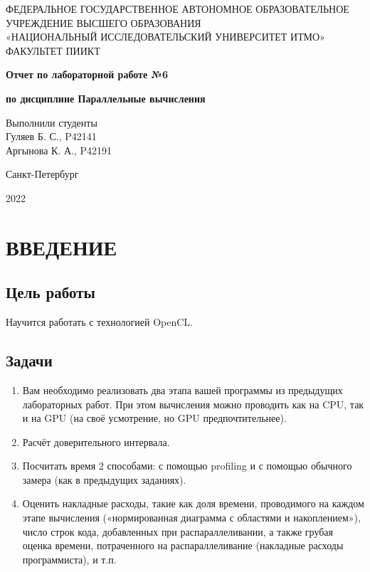 \documentclass[14pt, a4paper, oneside, final]{extarticle}
\begin{document}
 
\setcounter{page}{0}
\begin{center} 
\small
\footnotesize{ФЕДЕРАЛЬНОЕ ГОСУДАРСТВЕННОЕ АВТОНОМНОЕ ОБРАЗОВАТЕЛЬНОЕ}\\
\footnotesize{УЧРЕЖДЕНИЕ ВЫСШЕГО ОБРАЗОВАНИЯ}\\ 
\footnotesize{«НАЦИОНАЛЬНЫЙ ИССЛЕДОВАТЕЛЬСКИЙ УНИВЕРСИТЕТ ИТМО»}\\
\hfill \break 
\footnotesize{ФАКУЛЬТЕТ ПИИКТ}\\
\hfill \break
\hfill \break 
\hfill \break
\large{
    \textbf{Отчет по лабораторной работе №6}

    \textbf{по дисциплине Параллельные вычисления}
}

\hfill \break 
\end{center} 
\begin{flushright} 
Выполнили студенты\\
Гуляев Б. С., P42141\\
Аргынова К. А., P42191\\
\end{flushright}
\vspace*{\fill}
\begin{center}
Санкт-Петербург

2022
\end{center}
\normalsize
\thispagestyle{empty} 
\clearpage
\def\contentsname{ОГЛАВЛЕНИЕ}
\tableofcontents 

\clearpage
\section*{ВВЕДЕНИЕ}
\subsection*{Цель работы}
Научится работать с технологией OpenCL.
\subsection*{Задачи}
\begin{enumerate}
 \item Вам необходимо реализовать два этапа вашей программы из предыдущих лабораторных работ. При этом вычисления можно проводить как на CPU, так и на GPU (на своё усмотрение, но GPU предпочтительнее).

 \item Расчёт доверительного интервала.

 \item Посчитать время 2 способами: с помощью profiling и с помощью обычного замера (как в предыдущих заданиях).

 \item Оценить накладные расходы, такие как доля времени, проводимого на каждом этапе вычисления («нормированная диаграмма с областями и накоплением»), число строк кода, добавленных при распараллеливании, а также грубая оценка времени, потраченного на распараллеливание (накладные расходы программиста), и т.п.
\end{enumerate}
\end{document}
